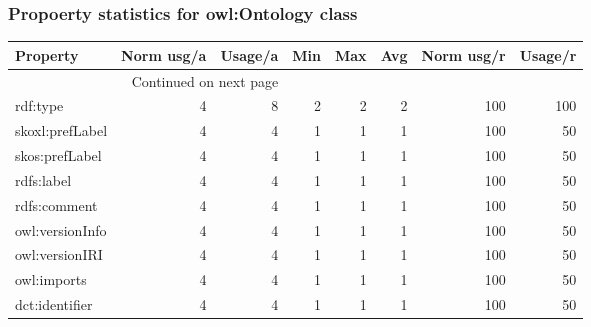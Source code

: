\documentclass[10pt,a4paper,titlepage,final]{article}
\begin{document}
\subsubsection{Propoerty statistics for owl:Ontology class}
\begin{longtable}{lrrrrrrr}
\toprule
        Property &  Norm usg/a &  Usage/a &  Min &  Max &  Avg &  Norm usg/r &  Usage/r \\
\midrule
\endhead
\midrule
\multicolumn{3}{r}{{Continued on next page}} \\
\midrule
\endfoot

\bottomrule
\endlastfoot
        rdf:type &           4 &        8 &    2 &    2 &    2 &         100 &      100 \\
 skoxl:prefLabel &           4 &        4 &    1 &    1 &    1 &         100 &       50 \\
  skos:prefLabel &           4 &        4 &    1 &    1 &    1 &         100 &       50 \\
      rdfs:label &           4 &        4 &    1 &    1 &    1 &         100 &       50 \\
    rdfs:comment &           4 &        4 &    1 &    1 &    1 &         100 &       50 \\
 owl:versionInfo &           4 &        4 &    1 &    1 &    1 &         100 &       50 \\
  owl:versionIRI &           4 &        4 &    1 &    1 &    1 &         100 &       50 \\
     owl:imports &           4 &        4 &    1 &    1 &    1 &         100 &       50 \\
  dct:identifier &           4 &        4 &    1 &    1 &    1 &         100 &       50 \\
\end{longtable}
\end{document}
